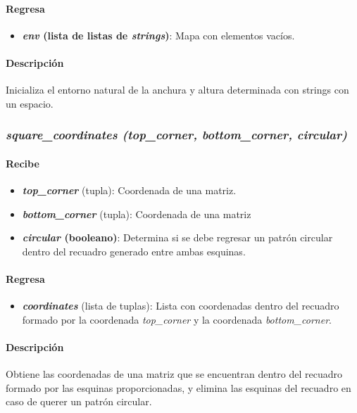 \documentclass[12pt, letterpaper]{article}
\begin{document}
            \paragraph{Regresa}
                \begin{itemize}
                    \item \textbf{\textit{env} (lista de listas de \textit{strings})}: Mapa con elementos vacíos.
                \end{itemize}
            \paragraph{Descripción}
                Inicializa el entorno natural de la anchura y altura determinada con strings con un espacio.
        \subsubsection{\textit{square\_coordinates (top\_corner, bottom\_corner, circular)}}
            \paragraph{Recibe}
                \begin{itemize}
                    \item \textbf{\textit{top\_corner}} (tupla): Coordenada de una matriz.
                    \item \textbf{\textit{bottom\_corner}} (tupla): Coordenada de una matriz
                    \item \textbf{\textit{circular} (booleano)}: Determina si se debe regresar un patrón circular dentro del recuadro generado entre ambas esquinas.
                \end{itemize}
            \paragraph{Regresa}
                \begin{itemize}
                    \item \textbf{\textit{coordinates}} (lista de tuplas): Lista con coordenadas dentro del recuadro formado por la coordenada \textit{top\_corner} y la coordenada \textit{bottom\_corner}.
                \end{itemize}
            \paragraph{Descripción}
                Obtiene las coordenadas de una matriz que se encuentran dentro del recuadro formado por las esquinas proporcionadas, y elimina las esquinas del recuadro en caso de querer un patrón circular.
\end{document}
